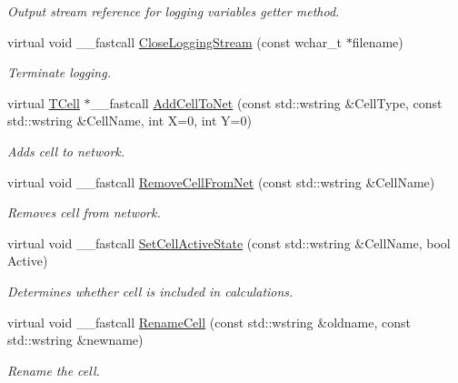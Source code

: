 \begin{DoxyCompactItemize}
\begin{DoxyCompactList}\small\item\em Output stream reference for logging variables getter method. \end{DoxyCompactList}\item 
\hypertarget{class_t_network_a4fe50c91d6a645e98132d1b616f63e34}{virtual void \+\_\+\+\_\+fastcall \hyperlink{class_t_network_a4fe50c91d6a645e98132d1b616f63e34}{Close\+Logging\+Stream} (const wchar\+\_\+t $\ast$filename)}\label{class_t_network_a4fe50c91d6a645e98132d1b616f63e34}

\begin{DoxyCompactList}\small\item\em Terminate logging. \end{DoxyCompactList}\item 
virtual \hyperlink{class_t_cell}{T\+Cell} $\ast$\+\_\+\+\_\+fastcall \hyperlink{class_t_network_aa6bd65ef73301e258fcb0a18f62aed65}{Add\+Cell\+To\+Net} (const std\+::wstring \&Cell\+Type, const std\+::wstring \&Cell\+Name, int X=0, int Y=0)
\begin{DoxyCompactList}\small\item\em Adds cell to network. \end{DoxyCompactList}\item 
virtual void \+\_\+\+\_\+fastcall \hyperlink{class_t_network_ad59490c229da774a859256f4c8152c3d}{Remove\+Cell\+From\+Net} (const std\+::wstring \&Cell\+Name)
\begin{DoxyCompactList}\small\item\em Removes cell from network. \end{DoxyCompactList}\item 
virtual void \+\_\+\+\_\+fastcall \hyperlink{class_t_network_ae2809d4ca770c3ef89533ff911219d25}{Set\+Cell\+Active\+State} (const std\+::wstring \&Cell\+Name, bool Active)
\begin{DoxyCompactList}\small\item\em Determines whether cell is included in calculations. \end{DoxyCompactList}\item 
virtual void \+\_\+\+\_\+fastcall \hyperlink{class_t_network_ad48a93ee8b8a5fc54afefcf1efba8c2c}{Rename\+Cell} (const std\+::wstring \&oldname, const std\+::wstring \&newname)
\begin{DoxyCompactList}\small\item\em Rename the cell. \end{DoxyCompactList}\item 

\end{DoxyCompactItemize}
